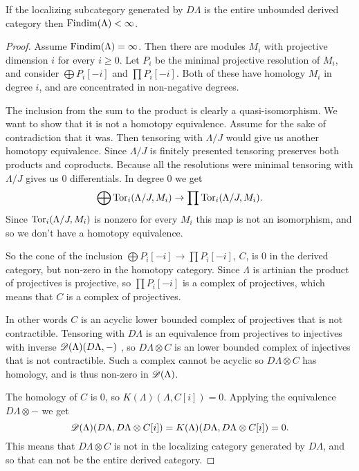 \begin{theorem}\cite[Theorem~4.3]{Rick19}\label{thm:injectives_generate_implies_FDC}
	If the localizing subcategory generated by $D\Lambda$ is the entire unbounded derived category then $\operatorname{Findim}(\Lambda) < \infty$.
	
	\begin{proof}
		Assume $\operatorname{Findim}(\Lambda) = \infty$. Then there are modules $M_i$ with projective dimension $i$ for every $i \geq 0$. Let $P_i$ be the minimal projective resolution of $M_i$, and consider $\bigoplus P_i[-i]$ and $\prod P_i[-i]$. Both of these have homology $M_i$ in degree $i$, and are concentrated in non-negative degrees.
		
		The inclusion from the sum to the product is clearly a quasi-isomorphism. We want to show that it is not a homotopy equivalence. Assume for the sake of contradiction that it was. Then tensoring with $\Lambda/J$ would give us another homotopy equivalence. Since $\Lambda/J$ is finitely presented tensoring preserves both products and coproducts. Because all the resolutions were minimal tensoring with $\Lambda/J$ gives us 0 differentials. In degree 0 we get $$\bigoplus \operatorname{Tor}_i(\Lambda/J, M_i) \to \prod \operatorname{Tor}_i(\Lambda/J, M_i) .$$
		Since $\operatorname{Tor}_i(\Lambda/J, M_i)$ is nonzero for every $M_i$ this map is not an isomorphism, and so we don't have a homotopy equivalence.
		
		So the cone of the inclusion $\bigoplus P_i[-i] \to \prod P_i[-i]$, $C$, is 0 in the derived category, but non-zero in the homotopy category. Since $\Lambda$ is artinian the product of projectives is projective\cite[Theorem~3.3]{Chase60}, so $\prod P_i[-i]$ is a complex of projectives, which means that $C$ is a complex of projectives. 
		
		In other words $C$ is an acyclic lower bounded complex of projectives that is not contractible. Tensoring with $D\Lambda$ is an equivalence from projectives to injectives with inverse $\operatorname{\mathscr{D}}(\Lambda)(D\Lambda, -)$ , so $D\Lambda \otimes C$ is an lower bounded complex of injectives that is not contractible. Such a complex cannot be acyclic so $D\Lambda \otimes C$ has homology, and is thus non-zero in $\operatorname{\mathscr{D}}(\Lambda)$.
		
		The homology of $C$ is 0, so $K(\Lambda)(\Lambda, C[i]) = 0$. Applying the equivalence $D\Lambda \otimes -$ we get $$\operatorname{\mathscr{D}}(\Lambda)(D\Lambda, D\Lambda \otimes C [i])=K(\Lambda)(D\Lambda, D\Lambda \otimes C [i])=0.$$ This means that $D\Lambda \otimes C$ is not in the localizing category generated by $D\Lambda$, and so that can not be the entire derived category.
	\end{proof}
\end{theorem}

